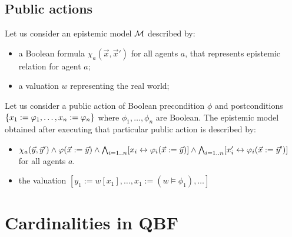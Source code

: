 \documentclass{article}
\begin{document}
\subsection{Public actions}

Let us consider an epistemic model $\mathcal M$ described by:
\begin{itemize}
	\item a Boolean formula $\chi_a(\vec x, \vec x')$ for all agents $a$, that represents epistemic relation for agent $a$;
	\item a valuation $w$ representing the real world;
\end{itemize}


Let us consider a public action of Boolean precondition $\phi$ and postconditions ${\{x_1 := \varphi_1, \dots, x_n := \varphi_n\}}$ where $\phi_1, \dots, \phi_n$ are Boolean. The epistemic model obtained after executing that particular public action is described by:
\begin{itemize}
	\item $\chi_a(\vec y, \vec y')  \land \varphi(\vec x := \vec y) \land \bigwedge_{i=1..n} [x_i \leftrightarrow \varphi_i(\vec x := \vec y)] \land \bigwedge_{i=1..n} [x_i' \leftrightarrow \varphi_i(\vec x := \vec y')]$ for all agents $a$.
	\item the valuation $[y_1 := w[x_1], \dots, x_1 := (w \models \phi_1), \dots]$
\end{itemize}




\section{Cardinalities in QBF}











%
%
\end{document}
